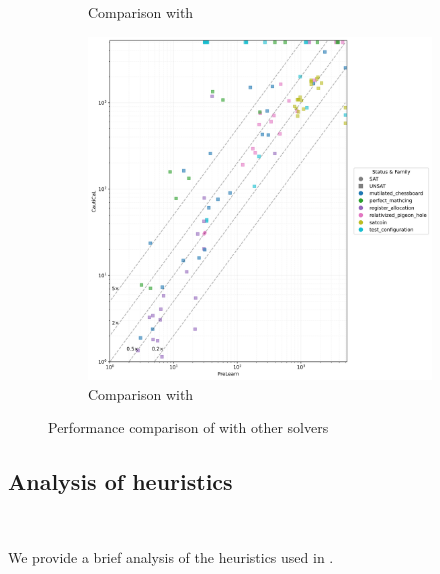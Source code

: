 \begin{figure}[!t]
\begin{subfigure}[t]{0.3\textwidth}
        \caption{Comparison with \prelearn}
        \label{fig:cautical-vs-prelearn}
    \end{subfigure}
    \begin{subfigure}[t]{0.3\textwidth}
        \centering
        \includegraphics[width=\textwidth]{figs/prelearn_vs_cautical_interesting_legend.jpg}
        \caption{Comparison with \prelearn}
        \label{fig:cautical-vs-prelearn}
    \end{subfigure}

    \caption{Performance comparison of \tool with other solvers}
    \label{fig:solver-comparison}
\end{figure}





\subsection{Analysis of heuristics}~\label{subsec:eval-heuristics}

We provide a brief analysis of the heuristics used in \tool.


